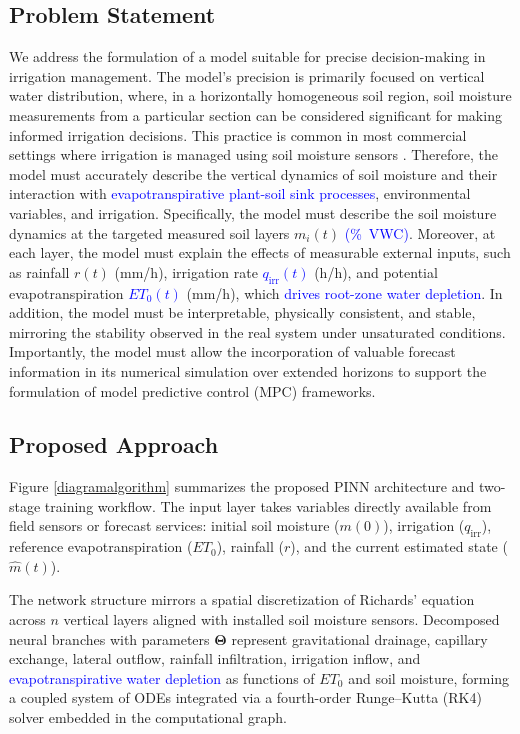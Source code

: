 \documentclass[pdflatex,sn-nature]{sn-jnl}%
\theoremstyle{thmstyleone}%
\theoremstyle{thmstyletwo}%
\theoremstyle{thmstylethree}%
\begin{document}
\subsection{Problem Statement}
We address the formulation of a model suitable for precise decision-making in irrigation management. The model's precision is primarily focused on vertical water distribution, where, in a horizontally homogeneous soil region, soil moisture measurements from a particular section can be considered significant for making informed irrigation decisions. This practice is common in most commercial settings where irrigation is managed using soil moisture sensors \cite{Rossini2021, Mandal2025}.
Therefore, the model must accurately describe the vertical dynamics of soil moisture and their interaction with \textcolor{blue}{evapotranspirative plant-soil sink processes}, environmental variables, and irrigation. Specifically, the model must describe the soil moisture dynamics at the targeted measured soil layers $m_i(t)$ \textcolor{blue}{(\si{\%VWC})}. 
Moreover, at each layer, the model must explain the effects of measurable external inputs, such as rainfall $r(t)$ (\si{mm/h}), irrigation rate \textcolor{blue}{$q_{\mathrm{irr}}(t)$} (\si{h/h}), and potential evapotranspiration \textcolor{blue}{$ET_0(t)$} (\si{mm/h}), which \textcolor{blue}{drives root-zone water depletion}.
In addition, the model must be interpretable, physically consistent, and stable, mirroring the stability observed in the real system under unsaturated conditions.
Importantly, the model must allow the incorporation of valuable forecast information in its numerical simulation over extended horizons to support the formulation of model predictive control (MPC) frameworks.


\subsection{Proposed Approach}

Figure \ref{diagramalgorithm} summarizes the proposed PINN architecture and two-stage training workflow. The input layer takes variables directly available from field sensors or forecast services: initial soil moisture ($m(0)$), irrigation ($q_{\mathrm{irr}}$), reference evapotranspiration ($ET_0$), rainfall ($r$), and the current estimated state ($\hat{m}(t)$).

The network structure mirrors a spatial discretization of Richards' equation across $n$ vertical layers aligned with installed soil moisture sensors. Decomposed neural branches with parameters $\boldsymbol{\Theta}$ represent gravitational drainage, capillary exchange, lateral outflow, rainfall infiltration, irrigation inflow, and \textcolor{blue}{evapotranspirative water depletion} as functions of $ET_0$ and soil moisture, forming a coupled system of ODEs integrated via a fourth-order Runge--Kutta (RK4) solver embedded in the computational graph.
\end{document}
